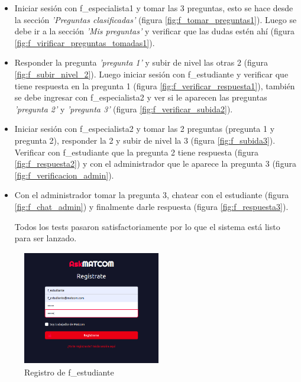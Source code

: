 \begin{itemize}
	\item Iniciar sesión con f\_especialista1 y tomar las 3 preguntas, esto se hace desde la sección \textit{'Preguntas clasificadas'} (figura \ref{fig:f_tomar_preguntas1}). Luego se debe ir a la sección \textit{'Mis preguntas'} y verificar que las dudas estén ahí (figura \ref{fig:f_virificar_preguntas_tomadas1}).
	
	\item Responder la pregunta \textit{'pregunta 1'} y subir de nivel las otras 2 (figura \ref{fig:f_subir_nivel_2}). Luego iniciar sesión con f\_estudiante y verificar que tiene respuesta en la pregunta 1 (figura \ref{fig:f_verificar_respuesta1}), también se debe ingresar con f\_especialista2 y ver si le aparecen las preguntas \textit{'pregunta 2'} y \textit{'pregunta 3'} (figura \ref{fig:f_verificar_subida2}).
	
	\item Iniciar sesión con f\_especialista2 y tomar las 2 preguntas (pregunta 1 y pregunta 2), responder la 2 y subir de nivel la 3 (figura \ref{fig:f_subida3}). Verificar con f\_estudiante que la pregunta 2 tiene respuesta (figura \ref{fig:f_respuesta2}) y con el administrador que le aparece la pregunta 3 (figura \ref{fig:f_verificacion_admin}).
	
	\item Con el administrador tomar la pregunta 3, chatear con el estudiante (figura \ref{fig:f_chat_admin}) y finalmente darle respuesta (figura \ref{fig:f_respuesta3}).
\newline

	
Todos los tests pasaron satisfactoriamente por lo que el sistema está listo para ser lanzado.
	
\end{itemize}


	\begin{figure}[h]
		\begin{center}
		\includegraphics[width=6cm, height=5cm]{registro_f_estudiante.png}
		\caption{Registro de f\_estudiante}
		\label{fig:f_estudiante_registro}
		
	\end{center}
	\end{figure}

